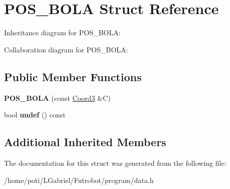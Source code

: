 \hypertarget{structPOS__BOLA}{}\section{P\+O\+S\+\_\+\+B\+O\+LA Struct Reference}
\label{structPOS__BOLA}


Inheritance diagram for P\+O\+S\+\_\+\+B\+O\+LA\+:


Collaboration diagram for P\+O\+S\+\_\+\+B\+O\+LA\+:
\subsection*{Public Member Functions}
\begin{DoxyCompactItemize}
\item 
{\bfseries P\+O\+S\+\_\+\+B\+O\+LA} (const \hyperlink{structCoord3}{Coord3} \&C)\hypertarget{structPOS__BOLA_a56b0e6d769b604f163747abe136272ea}{}\label{structPOS__BOLA_a56b0e6d769b604f163747abe136272ea}

\item 
bool {\bfseries undef} () const \hypertarget{structPOS__BOLA_a0044d9c8b27b6a2340e178c949c7eaf2}{}\label{structPOS__BOLA_a0044d9c8b27b6a2340e178c949c7eaf2}

\end{DoxyCompactItemize}
\subsection*{Additional Inherited Members}


The documentation for this struct was generated from the following file\+:\begin{DoxyCompactItemize}
\item 
/home/poti/\+L\+Gabriel/\+Futrobot/program/data.\+h\end{DoxyCompactItemize}
